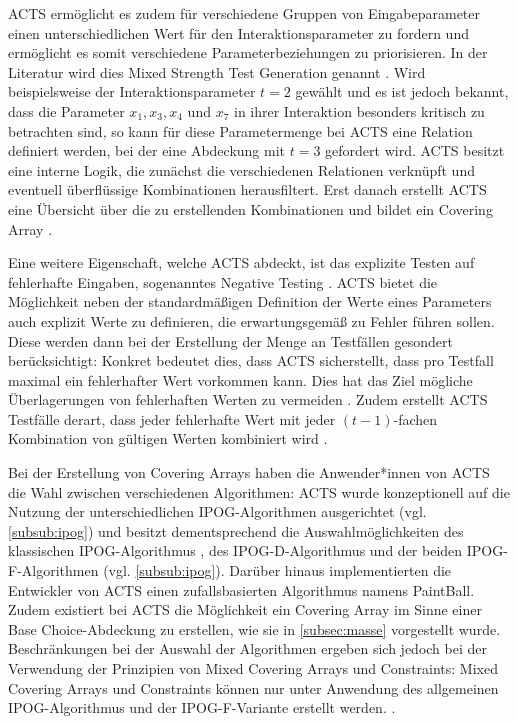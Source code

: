 ACTS ermöglicht es zudem für verschiedene Gruppen von Eingabeparameter einen unterschiedlichen Wert für den Interaktionsparameter zu fordern und ermöglicht es somit verschiedene Parameterbeziehungen zu priorisieren. In der Literatur wird dies \glqq Mixed Strength Test Generation\grqq{} genannt \cite{yu2013acts, czerwonka2006pairwise}. Wird beispielsweise der Interaktionsparameter $t = 2$ gewählt und es ist jedoch bekannt, dass die Parameter $x_1, x_3, x_4$ und $x_7$ in ihrer Interaktion besonders kritisch zu betrachten sind, so kann für diese Parametermenge bei ACTS eine \glqq Relation\grqq{} \cite{yu2013acts} definiert werden, bei der eine Abdeckung mit $t = 3$ gefordert wird. ACTS besitzt eine interne Logik, die zunächst die verschiedenen Relationen verknüpft und eventuell überflüssige Kombinationen herausfiltert. Erst danach erstellt ACTS eine Übersicht über die zu erstellenden Kombinationen und bildet ein Covering Array \cite{yu2013acts}.

Eine weitere Eigenschaft, welche ACTS abdeckt, ist das explizite Testen auf fehlerhafte Eingaben, sogenanntes \glqq Negative Testing\grqq{} \cite{acts_user_guide}. ACTS bietet die Möglichkeit neben der standardmäßigen Definition der Werte eines Parameters auch explizit Werte zu definieren, die erwartungsgemäß zu Fehler führen sollen. Diese werden dann bei der Erstellung der Menge an Testfällen gesondert berücksichtigt: Konkret bedeutet dies, dass ACTS sicherstellt, dass pro Testfall maximal ein fehlerhafter Wert vorkommen kann. Dies hat das Ziel mögliche Überlagerungen von fehlerhaften Werten zu vermeiden \cite{acts_user_guide}. Zudem erstellt ACTS Testfälle derart, dass jeder fehlerhafte Wert mit jeder $(t-1)$-fachen Kombination von gültigen Werten kombiniert wird \cite{acts_user_guide}.
  
Bei der Erstellung von Covering Arrays haben die Anwender*innen von ACTS die Wahl zwischen verschiedenen Algorithmen: ACTS wurde konzeptionell auf die Nutzung der unterschiedlichen IPOG-Algorithmen ausgerichtet (vgl. \autoref{subsub:ipog}) und besitzt dementsprechend die Auswahlmöglichkeiten des klassischen IPOG-Algorithmus \cite{lei2008ipog}, des IPOG-D-Algorithmus \cite{lei2008ipog} und der beiden IPOG-F-Algorithmen \cite{forbes2008refining} (vgl. \autoref{subsub:ipog}). Darüber hinaus implementierten die Entwickler von ACTS einen zufallsbasierten Algorithmus namens \glqq PaintBall\grqq{}. Zudem existiert bei ACTS die Möglichkeit ein Covering Array im Sinne einer Base Choice-Abdeckung zu erstellen, wie sie in \autoref{subsec:masse} vorgestellt wurde. Beschränkungen bei der Auswahl der Algorithmen ergeben sich jedoch bei der Verwendung der Prinzipien von Mixed Covering Arrays und Constraints: Mixed Covering Arrays und Constraints können nur unter Anwendung des allgemeinen IPOG-Algorithmus und der IPOG-F-Variante erstellt werden. \cite{acts_user_guide}.

